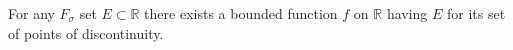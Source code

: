 For any $F_\sigma$ set $E \subset \mathbb{R}$ there exists a bounded function $f$ on $\mathbb{R}$ having $E$ for its set of points of discontinuity.
